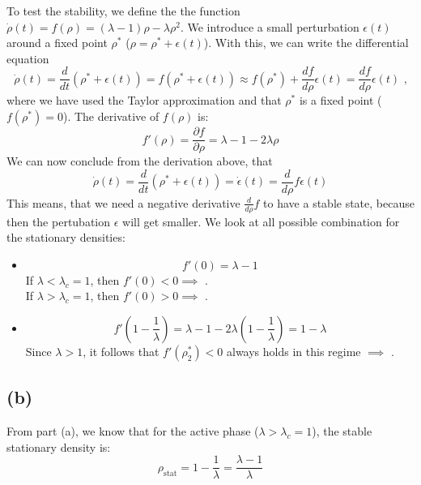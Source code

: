 \documentclass{article}
\begin{document}
To test the stability, we define the the function $\dot{\rho}(t) = f(\rho) = (\lambda - 1)\rho - \lambda\rho^2$. We introduce a small perturbation $\epsilon(t)$ around a fixed point $\rho^*$ ($\rho = \rho^* + \epsilon(t)$). With this, we can write the differential equation
\begin{equation}
    \dot{\rho}(t) = \frac{d}{dt} (\rho^* + \epsilon(t)) = f(\rho^* + \epsilon(t)) \approx f(\rho^*) + \frac{df}{d \rho} \epsilon(t) = \frac{df}{d \rho}  \epsilon(t) \text{ ,}
\end{equation}
where we have used the Taylor approximation and that $\rho^*$ is a fixed point ($f(\rho^*)=0$). The derivative of $f(\rho)$ is:
\begin{equation}
    f'(\rho) = \frac{\partial f}{\partial \rho} = \lambda - 1 - 2\lambda\rho
\end{equation}
We can now conclude from the derivation above, that
\begin{equation}
    \dot{\rho}(t) = \frac{d}{dt} (\rho^* + \epsilon(t))=\dot{\epsilon}(t) = \frac{d}{d \rho} f \epsilon(t)
\end{equation}
This means, that we need a negative derivative $\frac{d}{d \rho} f$ to have a stable state, because then the pertubation $\epsilon$ will get smaller. We look at all possible combination for the stationary densities:
\begin{itemize}
    \item {}
    \begin{equation}
        f'(0) = \lambda - 1
    \end{equation}
    If $\lambda < \lambda_c = 1$, then $f'(0) < 0 \implies$ .\\
    If $\lambda > \lambda_c = 1$, then $f'(0) > 0 \implies$ .

    \item {}
    \begin{equation}
        f'\left(1 - \frac{1}{\lambda}\right) = \lambda - 1 - 2\lambda\left(1 - \frac{1}{\lambda}\right) = 1 - \lambda
    \end{equation}
    Since $\lambda > 1$, it follows that $f'(\rho_2^*) < 0$ always holds in this regime $\implies$ .
\end{itemize}

\subsection*{(b)}
From part (a), we know that for the active phase ($\lambda > \lambda_c = 1$), the stable stationary density is:
\begin{equation}
    \rho_{\text{stat}} = 1 - \frac{1}{\lambda} = \frac{\lambda - 1}{\lambda}
\end{equation}
\end{document}
